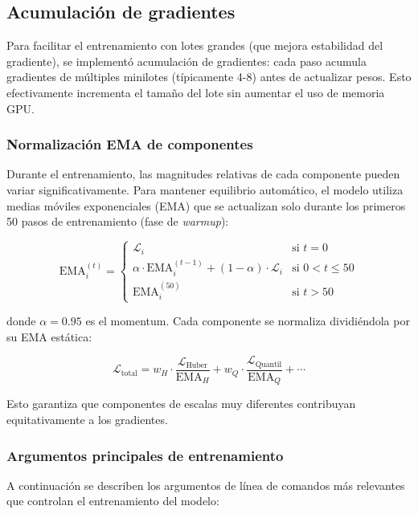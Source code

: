 \subsection{Acumulación de gradientes}
Para facilitar el entrenamiento con lotes grandes (que mejora estabilidad del gradiente), se implementó acumulación de gradientes: cada paso acumula gradientes de múltiples minilotes (típicamente 4-8) antes de actualizar pesos. Esto efectivamente incrementa el tamaño del lote sin aumentar el uso de memoria GPU.

\subsubsection{Normalización EMA de componentes}

Durante el entrenamiento, las magnitudes relativas de cada componente pueden variar significativamente. Para mantener equilibrio automático, el modelo utiliza medias móviles exponenciales (EMA) que se actualizan solo durante los primeros 50 pasos de entrenamiento (fase de \textit{warmup}):

\begin{equation}
\text{EMA}_i^{(t)} = \begin{cases}
\mathcal{L}_i & \text{si } t = 0 \\
\alpha \cdot \text{EMA}_i^{(t-1)} + (1 - \alpha) \cdot \mathcal{L}_i & \text{si } 0 < t \leq 50 \\
\text{EMA}_i^{(50)} & \text{si } t > 50
\end{cases}
\end{equation}

donde $\alpha = 0.95$ es el momentum. Cada componente se normaliza dividiéndola por su EMA estática:

\begin{equation}
\mathcal{L}_{\text{total}} = w_H \cdot \frac{\mathcal{L}_{\text{Huber}}}{\text{EMA}_H} + w_Q \cdot \frac{\mathcal{L}_{\text{Quantil}}}{\text{EMA}_Q} + \cdots
\end{equation}

Esto garantiza que componentes de escalas muy diferentes contribuyan equitativamente a los gradientes.

\subsubsection{Argumentos principales de entrenamiento}

A continuación se describen los argumentos de línea de comandos más relevantes que controlan el entrenamiento del modelo:

